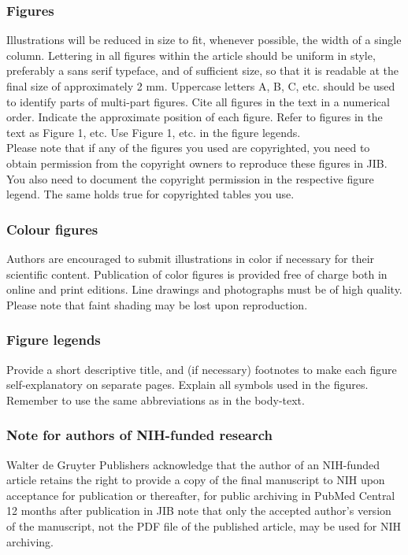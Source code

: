 \documentclass{jib}
\begin{document}
\subsubsection{Figures}

Illustrations will be reduced in size to fit, whenever possible, the width of a
single column. Lettering in all figures within the article should be uniform in
style, preferably a sans serif typeface, and of sufficient size, so that it is
readable at the final size of approximately 2 mm. Uppercase letters A, B, C,
etc. should be used to identify parts of multi-part figures. Cite all figures in
the text in a numerical order. Indicate the approximate position of each figure.
Refer to figures in the text as Figure 1, etc. Use Figure 1, etc. in the figure
legends.
\\
Please note that if any of the figures you used are copyrighted, you need to
obtain permission from the copyright owners to reproduce these figures in JIB.
You also need to document the copyright permission in the respective figure
legend. The same holds true for copyrighted tables you use.

\subsubsection{Colour figures}

Authors are encouraged to submit illustrations in color if necessary for their
scientific content. Publication of color figures is provided free of charge both
in online and print editions. Line drawings and photographs must be of high
quality. Please note that faint shading may be lost upon reproduction.

\subsubsection{Figure legends}

Provide a short descriptive title, and (if necessary) footnotes to make each
figure self-explanatory on separate pages. Explain all symbols used in the
figures. Remember to use the same abbreviations as in the body-text.

\subsubsection{Note for authors of NIH-funded research}

Walter de Gruyter Publishers acknowledge that the author of an NIH-funded
article retains the right to provide a copy of the final manuscript to NIH upon
acceptance for publication or thereafter, for public archiving in PubMed Central
12 months after publication in JIB note that only the accepted author's version
of the manuscript, not the PDF file of the published article, may be used for
NIH archiving.
\end{document}

